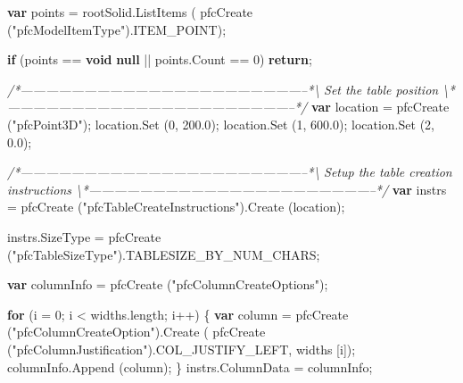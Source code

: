 \documentclass[]{article}
\newenvironment{Shaded}{}{}
\newcommand{\KeywordTok}[1]{\textcolor[rgb]{0.00,0.44,0.13}{\textbf{{#1}}}}
\newcommand{\DecValTok}[1]{\textcolor[rgb]{0.25,0.63,0.44}{{#1}}}
\newcommand{\FloatTok}[1]{\textcolor[rgb]{0.25,0.63,0.44}{{#1}}}
\newcommand{\StringTok}[1]{\textcolor[rgb]{0.25,0.44,0.63}{{#1}}}
\newcommand{\CommentTok}[1]{\textcolor[rgb]{0.38,0.63,0.69}{\textit{{#1}}}}
\newcommand{\OtherTok}[1]{\textcolor[rgb]{0.00,0.44,0.13}{{#1}}}
\newcommand{\FunctionTok}[1]{\textcolor[rgb]{0.02,0.16,0.49}{{#1}}}
\newcommand{\NormalTok}[1]{{#1}}
\begin{document}
\begin{Shaded}
\begin{Highlighting}[]
  \KeywordTok{var} \NormalTok{points = }\OtherTok{rootSolid}\NormalTok{.}\FunctionTok{ListItems} \NormalTok{(}
                    \FunctionTok{pfcCreate} \NormalTok{(}\StringTok{"pfcModelItemType"}\NormalTok{).}\FunctionTok{ITEM_POINT}\NormalTok{);}
  
  \KeywordTok{if} \NormalTok{(points == }\KeywordTok{void} \KeywordTok{null} \NormalTok{|| }\OtherTok{points}\NormalTok{.}\FunctionTok{Count} \NormalTok{== }\DecValTok{0}\NormalTok{)}
    \KeywordTok{return}\NormalTok{;}

\CommentTok{/*--------------------------------------------------------------------*\textbackslash{}    }
\CommentTok{  Set the table position}
\CommentTok{\textbackslash{}*--------------------------------------------------------------------*/} 
  \KeywordTok{var} \NormalTok{location = }\FunctionTok{pfcCreate} \NormalTok{(}\StringTok{"pfcPoint3D"}\NormalTok{);}
  \OtherTok{location}\NormalTok{.}\FunctionTok{Set} \NormalTok{(}\DecValTok{0}\NormalTok{, }\FloatTok{200.0}\NormalTok{);}
  \OtherTok{location}\NormalTok{.}\FunctionTok{Set} \NormalTok{(}\DecValTok{1}\NormalTok{, }\FloatTok{600.0}\NormalTok{);}
  \OtherTok{location}\NormalTok{.}\FunctionTok{Set} \NormalTok{(}\DecValTok{2}\NormalTok{, }\FloatTok{0.0}\NormalTok{);}
       
\CommentTok{/*--------------------------------------------------------------------*\textbackslash{}    }
\CommentTok{  Setup the table creation instructions}
\CommentTok{\textbackslash{}*--------------------------------------------------------------------*/} 
  \KeywordTok{var} \NormalTok{instrs = }
    \FunctionTok{pfcCreate} \NormalTok{(}\StringTok{"pfcTableCreateInstructions"}\NormalTok{).}\FunctionTok{Create} \NormalTok{(location);   }
  
  \OtherTok{instrs}\NormalTok{.}\FunctionTok{SizeType} \NormalTok{=}
    \FunctionTok{pfcCreate} \NormalTok{(}\StringTok{"pfcTableSizeType"}\NormalTok{).}\FunctionTok{TABLESIZE_BY_NUM_CHARS}\NormalTok{;}
  
  \KeywordTok{var} \NormalTok{columnInfo = }\FunctionTok{pfcCreate} \NormalTok{(}\StringTok{"pfcColumnCreateOptions"}\NormalTok{);}
  
  \KeywordTok{for} \NormalTok{(i = }\DecValTok{0}\NormalTok{; i < }\OtherTok{widths}\NormalTok{.}\FunctionTok{length}\NormalTok{; i++)}
    \NormalTok{\{}
      \KeywordTok{var} \NormalTok{column = }\FunctionTok{pfcCreate} \NormalTok{(}\StringTok{"pfcColumnCreateOption"}\NormalTok{).}\FunctionTok{Create} \NormalTok{(}
                  \FunctionTok{pfcCreate} \NormalTok{(}\StringTok{"pfcColumnJustification"}\NormalTok{).}\FunctionTok{COL_JUSTIFY_LEFT}\NormalTok{,}
          \NormalTok{widths [i]);}
      \OtherTok{columnInfo}\NormalTok{.}\FunctionTok{Append} \NormalTok{(column);}
    \NormalTok{\}}
  \OtherTok{instrs}\NormalTok{.}\FunctionTok{ColumnData} \NormalTok{= columnInfo;}
  

\end{Highlighting}
\end{Shaded}
\end{document}
